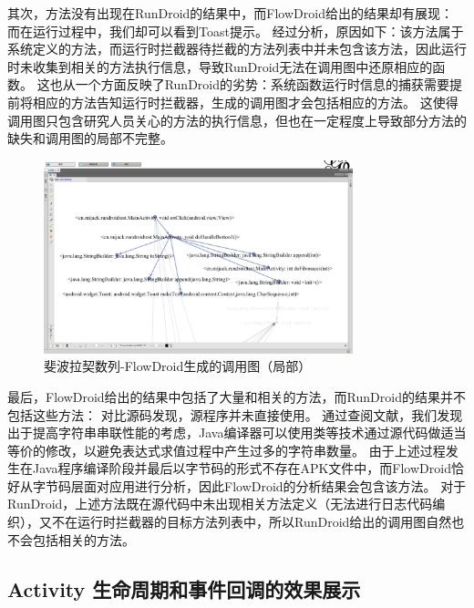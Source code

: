 其次，方法没有出现在RunDroid的结果中，而FlowDroid给出的结果却有展现：
而在运行过程中，我们却可以看到Toast提示。
经过分析，原因如下：该方法属于系统定义的方法，而运行时拦截器待拦截的方法列表中并未包含该方法，因此运行时未收集到相关的方法执行信息，导致RunDroid无法在调用图中还原相应的函数。
这也从一个方面反映了RunDroid的劣势：系统函数运行时信息的捕获需要提前将相应的方法告知运行时拦截器，生成的调用图才会包括相应的方法。
这使得调用图只包含研究人员关心的方法的执行信息，但也在一定程度上导致部分方法的缺失和调用图的局部不完整。


\begin{figure}[!ht]
	\centering
	\includegraphics[width=0.8\textwidth]{./Figures/FlowDroid-Fibonacci.png}
	\caption{斐波拉契数列-FlowDroid生成的调用图（局部）}
	\label{fig:flowdroid-result-Fibonacci}
\end{figure}


最后，FlowDroid给出的结果中包括了大量和相关的方法，而RunDroid的结果并不包括这些方法：
对比源码发现，源程序并未直接使用。
通过查阅文献\cite{gosling2000java}，我们发现出于提高字符串串联性能的考虑，Java编译器可以使用类等技术通过源代码做适当等价的修改，以避免表达式求值过程中产生过多的字符串数量。
由于上述过程发生在Java程序编译阶段并最后以字节码的形式不存在APK文件中，而FlowDroid恰好从字节码层面对应用进行分析，因此FlowDroid的分析结果会包含该方法。
对于RunDroid，上述方法既在源代码中未出现相关方法定义（无法进行日志代码编织），又不在运行时拦截器的目标方法列表中，所以RunDroid给出的调用图自然也不会包括相关的方法。



\subsection{Activity 生命周期和事件回调的效果展示}

